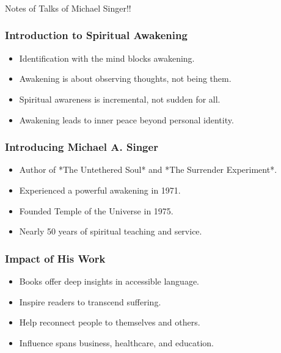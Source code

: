 \begin{frame}[fragile]\frametitle{}
\begin{center}
{\Large Notes of Talks of Michael Singer!!}

\end{center}
\end{frame}

\begin{frame}[fragile]\frametitle{Introduction to Spiritual Awakening}
    \begin{itemize}
        \item Identification with the mind blocks awakening.
        \item Awakening is about observing thoughts, not being them.
        \item Spiritual awareness is incremental, not sudden for all.
        \item Awakening leads to inner peace beyond personal identity.
    \end{itemize}
\end{frame}

\begin{frame}[fragile]\frametitle{Introducing Michael A. Singer}
    \begin{itemize}
        \item Author of *The Untethered Soul* and *The Surrender Experiment*.
        \item Experienced a powerful awakening in 1971.
        \item Founded Temple of the Universe in 1975.
        \item Nearly 50 years of spiritual teaching and service.
    \end{itemize}
\end{frame}

\begin{frame}[fragile]\frametitle{Impact of His Work}
    \begin{itemize}
        \item Books offer deep insights in accessible language.
        \item Inspire readers to transcend suffering.
        \item Help reconnect people to themselves and others.
        \item Influence spans business, healthcare, and education.
    \end{itemize}
\end{frame}

